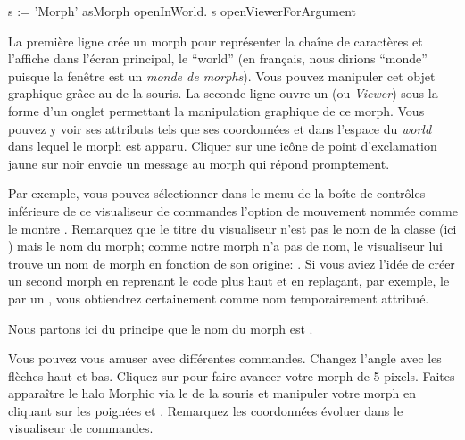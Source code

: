 \documentclass[a4paper,10pt,twoside]{book}
\begin{document}

\begin{code}{}
s := 'Morph' asMorph openInWorld.
s openViewerForArgument
\end{code}

La première ligne crée un morph pour représenter la chaîne
de caractères  et l'affiche dans
l'écran principal, le ``world'' (en français, nous dirions
``monde'' puisque la fenêtre \pharo est un \emph{monde de morphs}).
Vous pouvez manipuler cet objet graphique grâce au 
de la souris.
La seconde ligne ouvre un  (ou
\emph{Viewer}) sous la forme d'un onglet
permettant la manipulation graphique de ce morph. Vous pouvez y voir
ses attributs tels que ses coordonnées  et  dans
l'espace du \emph{world} dans lequel le morph est apparu.
Cliquer sur une icône de point d'exclamation jaune sur noir envoie un
message au morph qui répond promptement.

Par exemple, vous pouvez sélectionner dans le menu de la boîte de
contrôles inférieure de ce visualiseur de commandes l'option de
mouvement nommée  comme le montre .
Remarquez que le titre du visualiseur n'est pas le nom de la classe
(ici \mbox{)} mais le nom du morph; comme notre morph n'a pas
de nom, le visualiseur lui trouve un nom de morph en fonction de son
origine: . Si vous aviez l'idée de créer un second
morph en reprenant le code plus haut et en replaçant, par exemple,
le  par un , vous obtiendrez certainement  comme nom
temporairement attribué.

Nous partons ici du principe que le nom du morph est .


Vous pouvez vous amuser avec différentes commandes. Changez l'angle
avec les flèches haut et bas. Cliquez sur 
pour faire avancer votre morph de 5 pixels. Faites apparaître le halo
Morphic via le  de la souris et manipuler votre
morph en cliquant sur les poignées \grabHandle{} et \rotateHandle{}.
Remarquez les coordonnées évoluer dans le visualiseur de commandes.
\end{document}
